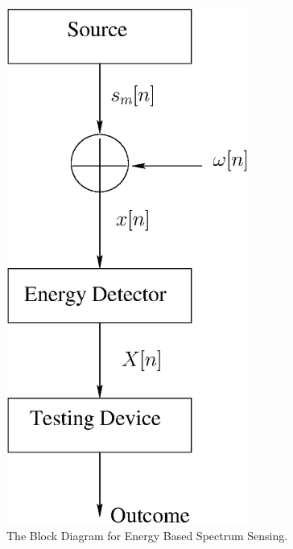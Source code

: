 \documentclass[12pt,journal,a4paper,twoside,onecolumn]{IEEEtran}
\begin{document}
\begin{spacing}{2.5}
\begin{figure}[!t]
\centering
\includegraphics[width=8cm]{fig1.eps}
\caption{The Block Diagram for Energy Based Spectrum Sensing.}
\label{pic: block diagram}
\end{figure}


\end{spacing}
\end{document}
